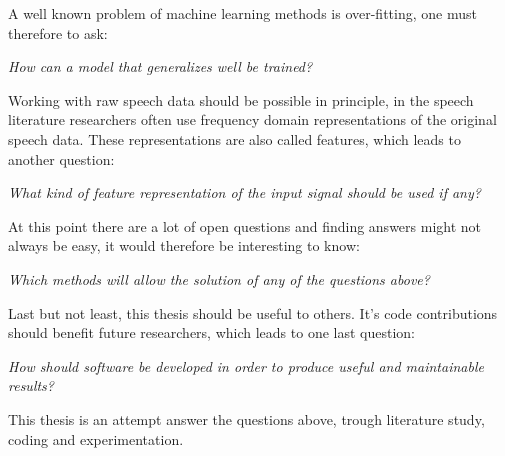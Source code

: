 A well known problem of machine learning methods is over-fitting, one must therefore to ask:

\noindent \textit{How can a model that generalizes well be trained?}
 

Working with raw speech data should be possible in principle, in the speech literature researchers often use frequency domain representations of the original speech data. These representations are also called features, which leads to another question:

\noindent \textit{What kind of feature representation of the input signal should be used if any?}

At this point there are a lot of open questions and finding answers might not always be easy, it would therefore be interesting to know: 

\noindent \textit{Which methods will allow the solution of any of the questions above?}

Last but not least, this thesis should be useful to others. It's code contributions should benefit future researchers, which leads to one last question:

\noindent \textit{How should software be developed in order to produce useful and maintainable results?}

This thesis is an attempt answer the questions above, trough literature study, coding and experimentation.



